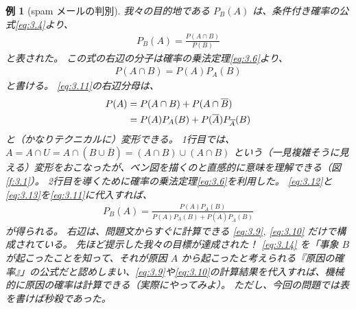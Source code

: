 \documentclass[12pt]{ltjsarticle}\usepackage{ifthen}\newcounter{enlarge}\setcounter{enlarge}{1}
\newtheorem{eg}{例}
\begin{document}
\begin{eg}[spam メールの判別]
  我々の目的地である $P_B (A)$ は、条件付き確率の公式\eqref{eq:3.4}より、
  \begin{align}
    P_B (A) = \frac{P(A \cap B)}{P(B)} \label{eq:3.11}
  \end{align}
  と表された。
  この式の右辺の分子は確率の乗法定理\eqref{eq:3.6}より、
  \begin{align}
    P(A \cap B) = P(A) P_A (B) \label{eq:3.12}
  \end{align}
  と書ける。
  \eqref{eq:3.11}の右辺分母は、
  \begin{align}
    P(A) &= P(A \cap B) + P(A \cap \overline{B}) \notag \\
         &= P(A) P_A (B) + P(\overline{A}) P_{\overline{A}} (B) \label{eq:3.13}
  \end{align}
  と（かなりテクニカルに）変形できる。
  1行目では、$A = A \cap U = A \cap (B \cup \overline{B}) = (A \cap B) \cup (A \cap B)$ という（一見複雑そうに見える）変形をおこなったが、ベン図を描くのと直感的に意味を理解できる（図\ref{f:3.1}）。
  2行目を導くために確率の乗法定理\eqref{eq:3.6}を利用した。
  \eqref{eq:3.12}と\eqref{eq:3.13}を\eqref{eq:3.11}に代入すれば、
  \begin{align}
    P_B (A) = \frac{P(A) P_A (B)}{P(A) P_A (B) + P(\overline{A}) P_{\overline{A}} (B)} \label{eq:3.14}
  \end{align}
  が得られる。
  右辺は、問題文からすぐに計算できる \eqref{eq:3.9}, \eqref{eq:3.10} だけで構成されている。
  先ほど提示した我々の目標が達成された！
  \eqref{eq:3.14} を「事象 $B$ が起こったことを知って、それが原因 $A$ から起こったと考えられる『原因の確率』」の公式だと認めしまい、\eqref{eq:3.9}や\eqref{eq:3.10}の計算結果を代入すれば、機械的に原因の確率は計算できる（実際にやってみよ）。
  ただし、今回の問題では表を書けば秒殺であった。


\end{eg}
\end{document}
